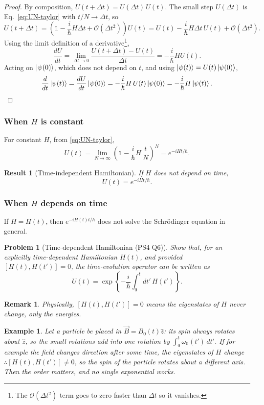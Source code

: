 \documentclass{article}
\newtheorem{problem}{Problem}
\newtheorem*{example}{Example}
\newtheorem{remark}{Remark}
\newtheorem{result}{Result}
\newcommand{\id}{\mathds{1}}
\begin{document}
\begin{proof}
    By composition, $U(t+\Delta t) = U(\Delta t)\,U(t)$. The small step $U(\Delta t)$ is Eq.~\eqref{eq:UN-taylor} with $t/N \to \Delta t$, so
    \[U(t+\Delta t) = \left(\id - \frac{i}{\hbar}H\Delta t + \mathcal{O}(\Delta t^2)\right)U(t) = U(t) - \frac{i}{\hbar}H\Delta t\,U(t) + \mathcal{O}(\Delta t^2).\]
    Using the limit definition of a derivative\footnote{The $\mathcal{O}(\Delta t^2)$ term goes to zero faster than $\Delta t$ so it vanishes.},
    \[\frac{dU}{dt} = \lim_{\Delta t\to 0}\frac{U(t+\Delta t) - U(t)}{\Delta t} = -\frac{i}{\hbar}HU(t).\]
    Acting on $\ket{\psi(0)}$, which does not depend on $t$, and using $\ket{\psi(t)} = U(t)\ket{\psi(0)}$,
    \[\frac{d}{dt}\ket{\psi(t)} = \frac{dU}{dt}\ket{\psi(0)} = -\frac{i}{\hbar}H\,U(t)\ket{\psi(0)} = -\frac{i}{\hbar}H\ket{\psi(t)}.\]
\end{proof}

\subsubsection{\texorpdfstring{When $H$ is constant}{When H is constant}}
For constant $H$, from \eqref{eq:UN-taylor},
\[U(t) = \lim_{N\to\infty}\left(\id - \frac{i}{\hbar}H\,\frac{t}{N}\right)^N = e^{-iHt/\hbar}.\]
\begin{result}[Time-independent Hamiltonian]
    If $H$ does not depend on time,
    \begin{equation}
        U(t) = e^{-iHt/\hbar}.
    \end{equation}
\end{result}

\subsubsection{\texorpdfstring{When $H$ depends on time}{When H depends on time}}
If $H = H(t)$, then $e^{-iH(t)t/\hbar}$ does not solve the Schr\"odinger equation in general.
\begin{problem}[Time-dependent Hamiltonian (PS4 Q6)]
    Show that, for an explicitly time-dependent Hamiltonian $H(t)$, and provided $[H(t),H(t')] = 0$, the time-evolution operator can be written as
    \begin{equation}
        \label{eq:U-time-dependent}
        U(t) = \exp\left\{-\frac{i}{\hbar}\int_0^t dt'\,H(t')\right\}.
    \end{equation}
\end{problem}
\begin{remark}
    Physically, $[H(t),H(t')] = 0$ means the eigenstates of $H$ never change, only the energies.
\end{remark}
\begin{example}
    Let a particle be placed in $\vec{B} = B_0(t)\hat{z}$: its spin always rotates about $\hat{z}$, so the small rotations add into one rotation by $\int_0^t\omega_0(t')\,dt'$. If for example the field changes direction after some time, the eigenstates of $H$ change $\therefore [H(t),H(t')] \neq 0$, so the spin of the particle rotates about a different axis. Then the order matters, and no single exponential works.
\end{example}
\end{document}
